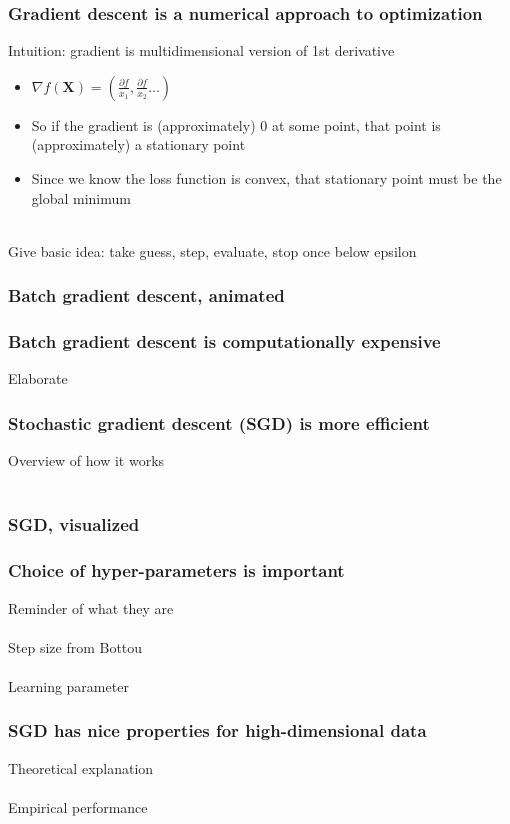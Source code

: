 \documentclass{beamer}
\begin{document}
\begin{frame}
	\frametitle{Gradient descent is a numerical approach to optimization}
	Intuition: gradient is multidimensional version of 1st derivative
	\begin{itemize}
		\item \small $\nabla f(\mathbf{X}) = (\frac{\partial f}{x_1},
			\frac{\partial f}{x_2}...)$
		\item So if the gradient is (approximately) 0 at some point, that point is
			(approximately) a stationary point 
		\item Since we know the loss function is convex, that stationary
			point must be the global minimum\\~\\
	\end{itemize}

	Give basic idea: take guess, step, evaluate, stop once below epsilon
\end{frame}

\begin{frame}
	\frametitle{Batch gradient descent, animated}
\end{frame}

\begin{frame}
	\frametitle{Batch gradient descent is computationally expensive}
	Elaborate
\end{frame}

\begin{frame}
	\frametitle{Stochastic gradient descent (SGD) is more efficient}
	Overview of how it works \\~\\
\end{frame}

\begin{frame}
	\frametitle{SGD, visualized}
\end{frame}

\begin{frame}
	\frametitle{Choice of hyper-parameters is important}
	Reminder of what they are \\~\\
	Step size from Bottou \\~\\
	Learning parameter
\end{frame}

\begin{frame}
	\frametitle{SGD has nice properties for high-dimensional
	data}
	Theoretical explanation \\~\\
	Empirical performance \\~\\

\end{frame}
\end{document}
